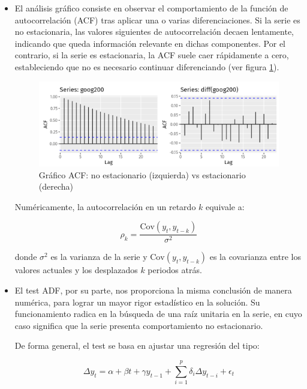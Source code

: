\begin{itemize}
    \item El análisis gráfico consiste en observar el comportamiento de la función de autocorrelación (ACF) tras aplicar una o varias diferenciaciones. Si la serie es no estacionaria, las valores siguientes de autocorrelación decaen lentamente, indicando que queda información relevante en dichas componentes. Por el contrario, si la serie es estacionaria, la ACF suele caer rápidamente a cero, estableciendo que no es necesario continuar diferenciando (ver figura \ref{acf}).

    \begin{figure}[H] %
        \centering
        \includegraphics[scale=0.25]{img/acf}
        \caption{Gráfico ACF: no estacionario (izquierda) vs estacionario (derecha) \cite{hyndman2021stationarity}}
        \label{acf}
    \end{figure}

    Numéricamente, la autocorrelación en un retardo \( k \) equivale a:

    \[
        \rho_k = \frac{\mathrm{Cov}(y_t, y_{t-k})}{\sigma^2}
    \]

    donde \( \sigma^2 \) es la varianza de la serie y \( \mathrm{Cov}(y_t, y_{t-k}) \) es la covarianza entre los valores actuales y los desplazados \( k \) periodos atrás.


    \item El test ADF, por su parte, nos proporciona la misma conclusión de manera numérica, para lograr un mayor rigor estadístico en la solución. Su funcionamiento radica en la búsqueda de una raíz unitaria en la serie, en cuyo caso significa que la serie presenta comportamiento no estacionario.

    De forma general, el test se basa en ajustar una regresión del tipo:

    \[
        \Delta y_t = \alpha + \beta t + \gamma y_{t-1} + \sum_{i=1}^{p} \delta_i \Delta y_{t-i} + \epsilon_t
    \]


\end{itemize}

